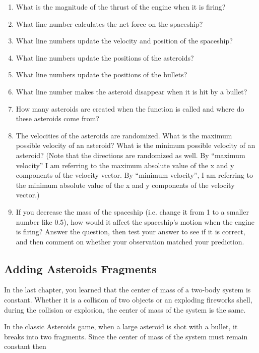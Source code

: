 \begin{enumerate}
\begin{enumerate}
	\item What is the magnitude of the thrust of the engine when it is firing?
	\item What line number calculates the net force on the spaceship?
	\item What line numbers update the velocity and position of the spaceship?
	\item What line numbers update the positions of the asteroids?
	\item What line numbers update the positions of the bullets?
	\item What line number makes the asteroid disappear when it is hit by a bullet?
	\item How many asteroids are created when the function  is called and where do these asteroids come from?
	\item The velocities of the asteroids are randomized. What is the maximum possible velocity of an asteroid? What is the minimum possible velocity of an asteroid?  (Note that the directions are randomized as well. By ``maximum velocity'' I am referring to the maximum absolute value of the x and y components of the velocity vector. By ``minimum velocity'', I am referring to the minimum absolute value of the x and y components of the velocity vector.)
	\item If you decrease the mass of the spaceship (i.e. change it from 1 to a smaller number like 0.5), how would it affect the spaceship's motion when the engine is firing? Answer the question, then test your answer to see if it is correct, and then comment on whether your observation matched your prediction.
	
	\smallframe{\ }
	
\end{enumerate}

\subsection*{Adding Asteroids Fragments}

In the last chapter, you learned that the center of mass of a two-body system is constant. Whether it is a collision of two objects or an exploding fireworks shell, during the collision or explosion, the center of mass of the system is the same.

In the classic Asteroids game, when a large asteroid is shot with a bullet, it breaks into two fragments. Since the center of mass of the system must remain constant then


\end{enumerate}
